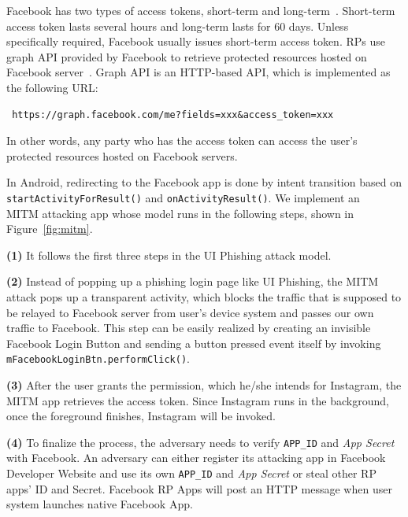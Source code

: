 \documentclass[letterpaper,12pt]{article}
\begin{document}
Facebook has two types of access tokens, short-term and
long-term~\cite{fbaccesstoken}. Short-term access token lasts several
hours and long-term lasts for 60 days. Unless specifically required,
Facebook usually issues short-term access token. RPs use graph API
provided by Facebook to retrieve protected resources hosted on
Facebook server~\cite{graphapi}. Graph API is an HTTP-based API, which
is implemented as the following URL:
 \begin{lstlisting}
 https://graph.facebook.com/me?fields=xxx&access_token=xxx
 \end{lstlisting}

In other words, any party who has the access token can access the
user's protected resources hosted on Facebook servers.

In Android, redirecting to the Facebook app is done by intent
transition based on \texttt{startActivityForResult()} and
\texttt{onActivityResult()}.  We implement an\\
 MITM attacking app whose
model runs in the following steps, shown in Figure~\ref{fig:mitm}.

\textbf{(1)} It follows the first three steps in the UI Phishing
attack model.

\textbf{(2)} Instead of popping up a phishing login
page like UI Phishing, the MITM attack pops up a transparent activity,
which blocks the traffic that is supposed to be relayed to Facebook
server from user's device system and passes our own traffic to
Facebook. This step can be easily realized by creating an invisible
Facebook Login Button and sending a button pressed event itself by
invoking \texttt{mFacebookLoginBtn.performClick()}.

\textbf{(3)} After the user grants the permission, which he/she
intends for Instagram, the MITM app retrieves the access token. Since
Instagram runs in the background, once the foreground finishes,
Instagram will be invoked.


\textbf{(4)} To finalize the process, the adversary needs to verify
\texttt{APP\_ID} and \emph{App Secret} with Facebook. An adversary can
either register its attacking app in Facebook Developer Website and
use its own \texttt{APP\_ID} and \emph{App Secret} or steal other RP
apps' ID and Secret. Facebook RP Apps will post an HTTP message when
user system launches native Facebook App.
\end{document}

